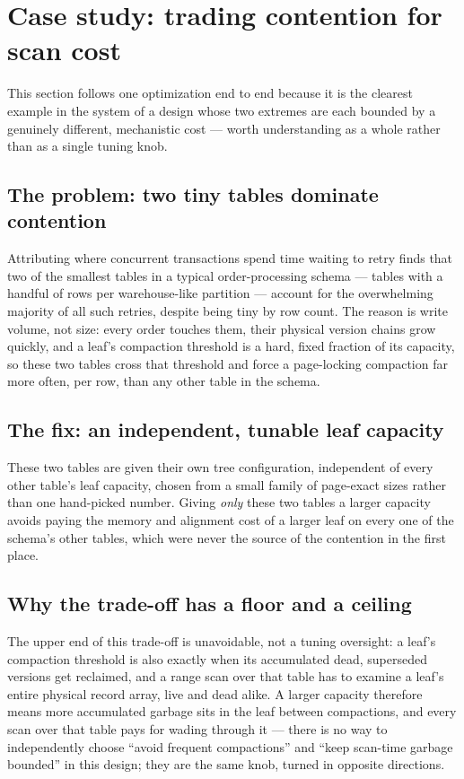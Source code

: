 \documentclass[11pt]{article}
\begin{document}
\section{Case study: trading contention for scan cost}
\label{sec:bigtree}

This section follows one optimization end to end because it is the clearest example
in the system of a design whose two extremes are each bounded by a genuinely
different, mechanistic cost --- worth understanding as a whole rather than as a
single tuning knob.

\subsection{The problem: two tiny tables dominate contention}

Attributing where concurrent transactions spend time waiting to retry finds that two
of the smallest tables in a typical order-processing schema --- tables with a
handful of rows per warehouse-like partition --- account for the overwhelming
majority of all such retries, despite being tiny by row count. The reason is write
volume, not size: every order touches them, their physical version chains grow
quickly, and a leaf's compaction threshold is a hard, fixed fraction of its
capacity, so these two tables cross that threshold and force a page-locking
compaction far more often, per row, than any other table in the schema.

\subsection{The fix: an independent, tunable leaf capacity}

These two tables are given their own tree configuration, independent of every other
table's leaf capacity, chosen from a small family of page-exact sizes rather than
one hand-picked number. Giving \emph{only} these two tables a larger capacity avoids
paying the memory and alignment cost of a larger leaf on every one of the schema's
other tables, which were never the source of the contention in the first place.

\subsection{Why the trade-off has a floor and a ceiling}

The upper end of this trade-off is unavoidable, not a tuning oversight: a leaf's
compaction threshold is also exactly when its accumulated dead, superseded versions
get reclaimed, and a range scan over that table has to examine a leaf's entire
physical record array, live and dead alike. A larger capacity therefore means more
accumulated garbage sits in the leaf between compactions, and every scan over that
table pays for wading through it --- there is no way to independently choose ``avoid
frequent compactions'' and ``keep scan-time garbage bounded'' in this design; they
are the same knob, turned in opposite directions.
\end{document}
